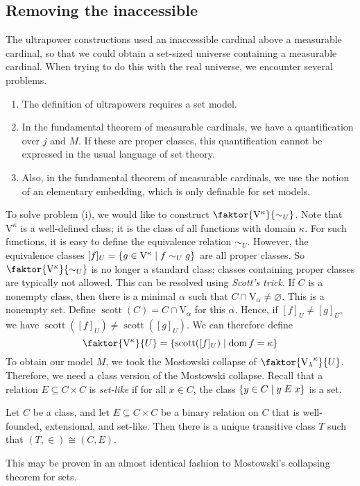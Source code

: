 \subsection{Removing the inaccessible}
The ultrapower constructions used an inaccessible cardinal above a measurable cardinal, so that we could obtain a set-sized universe containing a measurable cardinal.
When trying to do this with the real universe, we encounter several problems.
\begin{enumerate}
    \item The definition of ultrapowers requires a set model.
    \item In the fundamental theorem of measurable cardinals, we have a quantification over \( j \) and \( M \).
    If these are proper classes, this quantification cannot be expressed in the usual language of set theory.
    \item Also, in the fundamental theorem of measurable cardinals, we use the notion of an elementary embedding, which is only definable for set models.
\end{enumerate}
To solve problem (i), we would like to construct \( \faktor{\mathrm{V}^\kappa}{\sim_U} \).
Note that \( \mathrm{V}^\kappa \) is a well-defined class; it is the class of all functions with domain \( \kappa \).
For such functions, it is easy to define the equivalence relation \( \sim_U \).
However, the equivalence classes \( [f]_U = \qty{g \in \mathrm{V}^\kappa \mid f \sim_U g} \) are all proper classes.
So \( \faktor{\mathrm{V}^\kappa}{\sim_U} \) is no longer a standard class; classes containing proper classes are typically not allowed.
This can be resolved using \emph{Scott's trick}.
If \( C \) is a nonempty class, then there is a minimal \( \alpha \) such that \( C \cap \mathrm{V}_\alpha \neq \varnothing \).
This is a nonempty set.
Define \( \operatorname{scott}(C) = C \cap \mathrm{V}_\alpha \) for this \( \alpha \).
Hence, if \( [f]_U \neq [g]_U \), we have \( \operatorname{scott}([f]_U) \neq \operatorname{scott}([g]_U) \).
We can therefore define
\[ \faktor{\mathrm{V}^\kappa}{U} = \qty{\operatorname{scott}([f]_U) \mid \dom f = \kappa} \]
To obtain our model \( M \), we took the Mostowski collapse of \( \faktor{{\mathrm{V}_\lambda}^\kappa}{U} \).
Therefore, we need a class version of the Mostowski collapse.
Recall that a relation \( E \subseteq C \times C \) is \emph{set-like} if for all \( x \in C \), the class \( \qty{y \in C \mid y \mathrel{E} x} \) is a set.
\begin{theorem}
    Let \( C \) be a class, and let \( E \subseteq C \times C \) be a binary relation on \( C \) that is well-founded, extensional, and set-like.
    Then there is a unique transitive class \( T \) such that \( (T, \in) \cong (C, E) \).
\end{theorem}
This may be proven in an almost identical fashion to Mostowski's collapsing theorem for sets.

